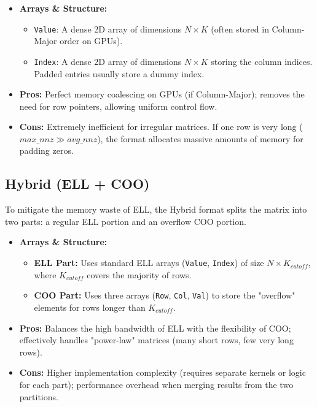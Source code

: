 \documentclass[a4paper,12pt]{article}
\begin{document}
\begin{itemize}
    \item \textbf{Arrays \& Structure:}
    \begin{itemize}
        \item \texttt{Value}: A dense 2D array of dimensions $N \times K$ (often stored in Column-Major order on GPUs).
        \item \texttt{Index}: A dense 2D array of dimensions $N \times K$ storing the column indices. Padded entries usually store a dummy index.
    \end{itemize}

    \item \textbf{Pros:} Perfect memory coalescing on GPUs (if Column-Major); removes the need for row pointers, allowing uniform control flow.
    \item \textbf{Cons:} Extremely inefficient for irregular matrices. If one row is very long ($max\_nnz \gg avg\_nnz$), the format allocates massive amounts of memory for padding zeros.
\end{itemize}



\subsection{Hybrid (ELL + COO)}
To mitigate the memory waste of ELL, the Hybrid format splits the matrix into two parts: a regular ELL portion and an overflow COO portion.

\begin{itemize}
    \item \textbf{Arrays \& Structure:}
    \begin{itemize}
        \item \textbf{ELL Part:} Uses standard ELL arrays (\texttt{Value}, \texttt{Index}) of size $N \times K_{cutoff}$, where $K_{cutoff}$ covers the majority of rows.
        \item \textbf{COO Part:} Uses three arrays (\texttt{Row}, \texttt{Col}, \texttt{Val}) to store the "overflow" elements for rows longer than $K_{cutoff}$.
    \end{itemize}

    \item \textbf{Pros:} Balances the high bandwidth of ELL with the flexibility of COO; effectively handles "power-law" matrices (many short rows, few very long rows).
    \item \textbf{Cons:} Higher implementation complexity (requires separate kernels or logic for each part); performance overhead when merging results from the two partitions.
\end{itemize}
\end{document}
